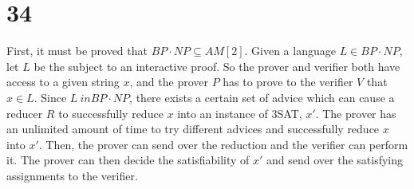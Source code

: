 \documentclass[letterpaper,notitlepage,twoside]{article}
\begin{document}
\section*{34}
First, it must be proved that $BP \cdot NP \subseteq AM\left[2\right]$. Given a language $L \in BP \cdot NP$, let $L$ be the subject to an interactive proof. So the prover and verifier both have access to a given string $x$, and the prover $P$ has to prove to the verifier $V$ that $x \in L$. Since $L \ in BP \cdot NP$, there exists a certain set of advice which can cause a reducer $R$ to successfully reduce $x$ into an instance of 3SAT, $x'$. The prover has an unlimited amount of time to try different advices and successfully reduce $x$ into $x'$. Then, the prover can send over the reduction and the verifier can perform it. The prover can then decide the satisfiability of $x'$ and send over the satisfying assignments to the verifier.
\end{document}

